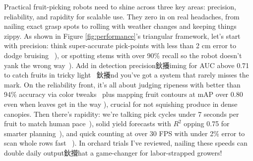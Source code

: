 \documentclass[a4paper,fleqn]{cas-dc}
\begin{document}
Practical fruit-picking robots need to shine across three key areas: precision, reliability, and rapidity for scalable use. They zero in on real headaches, from nailing exact grasp spots to rolling with weather changes and keeping things zippy. As shown in Figure \ref{fig:performance}'s triangular framework, 
let's start with precision: think super-accurate pick-points with less than 2 cm error to dodge bruising ~\cite{lehnert2016sweet}), or spotting stems with over 90\% recall so the robot doesn't yank the wrong way~\cite{mendes2016vine}). Add in detection precision鈥攁iming for AUC above 0.71 to catch fruits in tricky light ~\cite{sa2017peduncle}鈥攁nd you've got a system that rarely misses the mark.
 On the reliability front, it's all about judging ripeness with better than 94\% accuracy via color tweaks~\cite{goel2015fuzzy} plus mapping fruit contours at mAP over 0.80 even when leaves get in the way \cite{lin2019guava}), crucial for not squishing produce in dense canopies. 
Then there's rapidity: we're talking pick cycles under 7 seconds per fruit to match human pace~\cite{kang2020real}), solid yield forecasts with $R^2$ opping 0.75 for smarter planning~\cite{underwood2016mapping}), and quick counting at over 30 FPS with under 2\% error to scan whole rows fast  ~\cite{kang2020fast}). In orchard trials I've reviewed, nailing these speeds can double daily output鈥攚hat a game-changer for labor-strapped growers!
\end{document}
